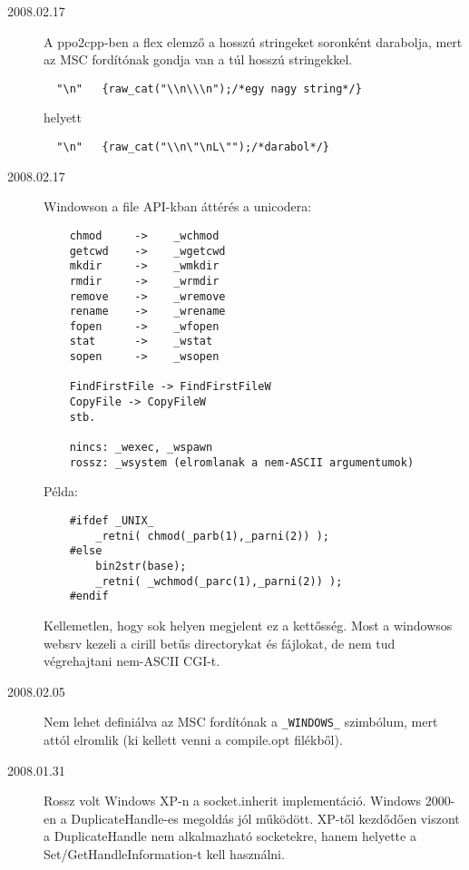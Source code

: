 \begin{description}
\item[2008.02.17]
  A ppo2cpp-ben a flex elemző a hosszú stringeket soronként darabolja,
  mert az MSC fordítónak gondja van a túl hosszú stringekkel.

\begin{verbatim}
  "\n"   {raw_cat("\\n\\\n");/*egy nagy string*/}
\end{verbatim}
  
  helyett

\begin{verbatim}
  "\n"   {raw_cat("\\n\"\nL\"");/*darabol*/}
\end{verbatim}

\item[2008.02.17]
  Windowson a file API-kban áttérés a unicodera:
\begin{verbatim}
    chmod     ->    _wchmod  
    getcwd    ->    _wgetcwd 
    mkdir     ->    _wmkdir  
    rmdir     ->    _wrmdir  
    remove    ->    _wremove 
    rename    ->    _wrename 
    fopen     ->    _wfopen  
    stat      ->    _wstat   
    sopen     ->    _wsopen  

    FindFirstFile -> FindFirstFileW
    CopyFile -> CopyFileW
    stb.
      
    nincs: _wexec, _wspawn 
    rossz: _wsystem (elromlanak a nem-ASCII argumentumok)
\end{verbatim}
    
  Példa:

\begin{verbatim}
    #ifdef _UNIX_
        _retni( chmod(_parb(1),_parni(2)) );
    #else
        bin2str(base);
        _retni( _wchmod(_parc(1),_parni(2)) );
    #endif
\end{verbatim}

  Kellemetlen, hogy sok helyen megjelent ez a kettősség.
  Most a windowsos websrv kezeli a cirill betűs directorykat
  és fájlokat, de nem tud végrehajtani nem-ASCII CGI-t.

\item[2008.02.05]
  Nem lehet definiálva az MSC fordítónak a \verb!_WINDOWS_! szimbólum, 
  mert attól elromlik (ki kellett venni a compile.opt filékből).

\item[2008.01.31]
  Rossz volt Windows XP-n a socket.inherit implementáció.
  Windows 2000-en a DuplicateHandle-es megoldás jól működött.
  XP-től kezdődően viszont a DuplicateHandle nem alkalmazható socketekre,
  hanem helyette a Set/GetHandleInformation-t kell használni.


\end{description}
